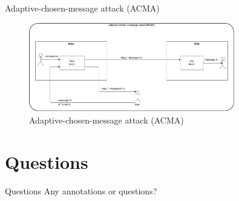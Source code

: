 \documentclass[ucs,9pt]{beamer}
\begin{document}
\begin{frame}{Adaptive-chosen-message attack (ACMA)}
    \begin{figure}[h]
        \centering
        \includegraphics[width=0.8\textwidth]{figures/ACMA.png}
        \caption{Adaptive-chosen-message attack (ACMA)}
    \end{figure}
\end{frame}


\section*{Questions}

\begin{frame}{Questions}
    \huge{Any annotations or questions?}
\end{frame}
\end{document}
